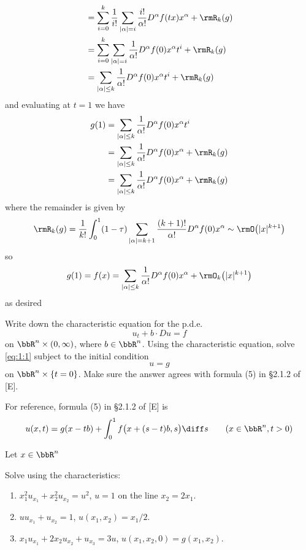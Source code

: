 \begin{solution}
\begin{align*}
    &=\sum_{i=0}^k\frac{1}{i!}\sum_{|\alpha|=i}\frac{i!}{\alpha!}D^\alpha
      f(tx)x^\alpha+\rmR_k(g)\\
    &=\sum_{i=0}^k\sum_{|\alpha|=i}\frac{1}{\alpha!}D^\alpha f(0)x^\alpha t^i+\rmR_k(g)\\
    &=\sum_{|\alpha|\leq k}\frac{1}{\alpha!}D^\alpha f(0)x^\alpha t^i+\rmR_k(g)
  \end{align*}
  and evaluating at \(t=1\) we have
  \begin{align*}
    g(1)
    &=\sum_{|\alpha|\leq k}\frac{1}{\alpha!}D^\alpha f(0)x^\alpha t^i\\
    &=\sum_{|\alpha|\leq k}\frac{1}{\alpha!}D^\alpha
      f(0)x^\alpha+\rmR_k(g)\\
    &=\sum_{|\alpha|\leq k}\frac{1}{\alpha!}D^\alpha
      f(0)x^\alpha+\rmR_k(g)
  \end{align*}
  where the remainder is given by
  \[
    \rmR_k(g)=\frac{1}{k!}\int_0^1(1-\tau)
    \sum_{|\alpha|=k+1}\frac{(k+1)!}{\alpha!}D^\alpha f(0)x^\alpha\sim
    \rmO\bigl(|x|^{k+1}\bigr)
  \]
  so
  \[
    g(1)=f(x)=\sum_{|\alpha|\leq k}\frac{1}{\alpha!}D^\alpha
    f(0)x^\alpha+\rmO_k\bigl(|x|^{k+1}\bigr)
  \]
  as desired
\end{solution}
\newpage

\begin{problem}
  Write down the characteristic equation for the p.d.e.\@
  \[
    \label{eq:1:1}
    \tag{\(*\)}
    u_t+b\cdot Du=f
  \]
  on \(\bbR^n\times(0,\infty)\), where \(b\in\bbR^n\). Using the
  characteristic equation, solve \eqref{eq:1:1} subject to the initial
  condition
  \[
    u=g
  \]
  on \(\bbR^n\times\{t=0\}\). Make sure the answer agrees with formula (5)
  in \S 2.1.2 of [E].
\end{problem}
\begin{solution}
  For reference, formula (5) in \S 2.1.2 of [E] is
  \[
    u(x,t)=g(x -tb)+\int_0^1 f\bigl(x+(s-t)b,s\bigr)\diff s
    \qquad (x\in\bbR^n,t>0)
  \]

  Let \(x\in\bbR^n\)
\end{solution}
\newpage

\begin{problem}
  Solve using the characteristics:
  \begin{enumerate}[label=(\alph*)]
  \item \(x_1^2u_{x_1}+x_2^2u_{x_2}=u^2\), \(u=1\) on the line
    \(x_2=2x_1\).
  \item \(uu_{x_1}+u_{x_2}=1\), \(u(x_1,x_2)=x_1/2\).
  \item \(x_1u_{x_1}+2x_2u_{x_2}+u_{x_3}=3u\),
    \(u(x_1,x_2,0)=g(x_1,x_2)\).
  \end{enumerate}
\end{problem}
\begin{solution}

\end{solution}
\newpage

